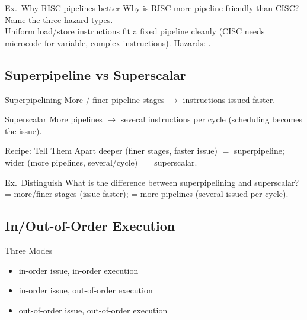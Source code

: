 \begin{example2}{Ex.\ Why RISC pipelines better}
    Why is RISC more pipeline-friendly than CISC? Name the three hazard types.
     \\ 
    Uniform load/store instructions fit a fixed pipeline cleanly (CISC needs microcode for variable, complex instructions). Hazards: .
\end{example2}

\subsection{Superpipeline vs Superscalar}


\begin{definition}{Superpipelining}
    More / finer pipeline stages $\to$ instructions issued faster.
\end{definition}

\begin{definition}{Superscalar}
    More pipelines $\to$ several instructions per cycle (scheduling becomes the issue).
\end{definition}

\multend

\begin{KR}{Recipe: Tell Them Apart}
    deeper (finer stages, faster issue) $=$ superpipeline; wider (more pipelines, several/cycle) $=$ superscalar.
\end{KR}

\begin{example2}{Ex.\ Distinguish}
    What is the difference between superpipelining and superscalar?
     \\ 
     = more/finer stages (issue faster);  = more pipelines (several issued per cycle).
\end{example2}

\subsection{In/Out-of-Order Execution}


\begin{definition}{Three Modes}
    \begin{itemize}
        \item in-order issue, in-order execution
        \item in-order issue, out-of-order execution
        \item out-of-order issue, out-of-order execution
    \end{itemize}
\end{definition}

